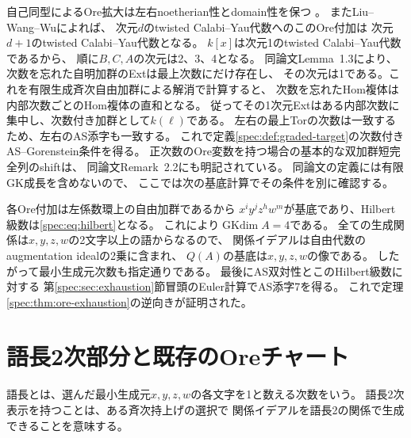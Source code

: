 \documentclass[11pt,a4paper]{ltjsarticle}
\theoremstyle{definition}
\newcommand{\GKdim}{\operatorname{GKdim}}
\begin{document}
自己同型によるOre拡大は左右noetherian性とdomain性を保つ
\cite[\S1.3]{LWW}。
またLiu--Wang--Wu\cite[Theorem~3.3]{LWW}によれば、
次元$d$のtwisted Calabi--Yau代数へのこのOre付加は
次元$d+1$のtwisted Calabi--Yau代数となる。
$k[x]$は次元1のtwisted Calabi--Yau代数であるから、
順に$B,C,A$の次元は2、3、4となる。
同論文Lemma~1.3により、次数を忘れた自明加群のExtは最上次数にだけ存在し、
その次元は1である。これを有限生成斉次自由加群による解消で計算すると、
次数を忘れたHom複体は内部次数ごとのHom複体の直和となる。
従ってその1次元Extはある内部次数に集中し、次数付き加群として$k(\ell)$である。
左右の最上Torの次数は一致するため、左右のAS添字も一致する。
これで定義\ref{spec:def:graded-target}の次数付きAS--Gorenstein条件を得る。
正次数のOre変数を持つ場合の基本的な双加群短完全列のshiftは、
同論文Remark~2.2にも明記されている。
同論文の定義には有限GK成長を含めないので、
ここでは次の基底計算でその条件を別に確認する。

各Ore付加は左係数環上の自由加群であるから
$x^iy^jz^hw^m$が基底であり、Hilbert級数は\eqref{spec:eq:hilbert}となる。
これにより$\GKdim A=4$である。
全ての生成関係は$x,y,z,w$の2文字以上の語からなるので、
関係イデアルは自由代数のaugmentation idealの2乗に含まれ、
$Q(A)$の基底は$x,y,z,w$の像である。
したがって最小生成元次数も指定通りである。
最後にAS双対性とこのHilbert級数に対する
第\ref{spec:sec:exhaustion}節冒頭のEuler計算でAS添字7を得る。
これで定理\ref{spec:thm:ore-exhaustion}の逆向きが証明された。

\section{語長2次部分と既存のOreチャート}\label{spec:sec:quadratic}
語長とは、選んだ最小生成元$x,y,z,w$の各文字を1と数える次数をいう。
語長2次表示を持つことは、ある斉次持上げの選択で
関係イデアルを語長2の関係で生成できることを意味する。
\end{document}
